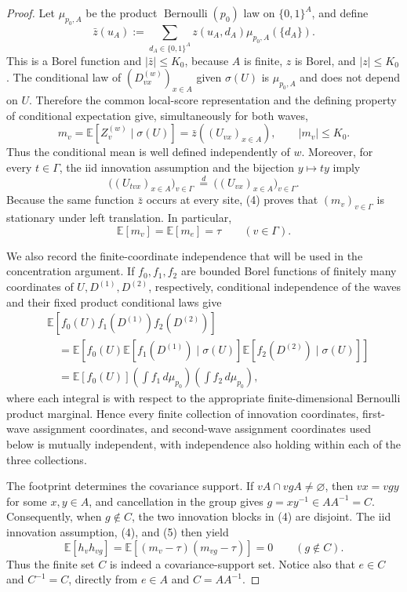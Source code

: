 \documentclass{article}
\begin{document}
\begin{proof}
Let \(\mu_{p_0,A}\) be the product \(\operatorname{Bernoulli}(p_0)\) law on \(\{0,1\}^A\), and define
\[
 \bar z(u_A)
 :=\sum_{d_A\in\{0,1\}^A}
 z(u_A,d_A)\mu_{p_0,A}(\{d_A\}). \tag{3}
\]
This is a Borel function and \(|\bar z|\le K_0\), because \(A\) is finite, \(z\) is Borel, and \(|z|\le K_0\).  The conditional law of \((D_{vx}^{(w)})_{x\in A}\) given \(\sigma(U)\) is \(\mu_{p_0,A}\) and does not depend on \(U\).  Therefore the common local-score representation and the defining property of conditional expectation give, simultaneously for both waves,
\[
 m_v
 =\mathbb E[Z_v^{(w)}\mid\sigma(U)]
 =\bar z((U_{vx})_{x\in A}),
 \qquad |m_v|\le K_0. \tag{4}
\]
Thus the conditional mean is well defined independently of \(w\).  Moreover, for every \(t\in\Gamma\), the iid innovation assumption and the bijection \(y\mapsto ty\) imply
\[
 \bigl((U_{tvx})_{x\in A}\bigr)_{v\in\Gamma}
 \ \stackrel{d}{=}\ 
 \bigl((U_{vx})_{x\in A}\bigr)_{v\in\Gamma}.
\]
Because the same function \(\bar z\) occurs at every site, (4) proves that \((m_v)_{v\in\Gamma}\) is stationary under left translation.  In particular,
\[
 \mathbb E[m_v]=\mathbb E[m_e]=\tau
 \qquad(v\in\Gamma). \tag{5}
\]

We also record the finite-coordinate independence that will be used in the concentration argument.  If \(f_0,f_1,f_2\) are bounded Borel functions of finitely many coordinates of \(U,D^{(1)},D^{(2)}\), respectively, conditional independence of the waves and their fixed product conditional laws give
\[
 \begin{aligned}
 &\mathbb E[f_0(U)f_1(D^{(1)})f_2(D^{(2)})]\\
 &\quad=\mathbb E\!\left[
 f_0(U)\mathbb E[f_1(D^{(1)})\mid\sigma(U)]
          \mathbb E[f_2(D^{(2)})\mid\sigma(U)]\right]\\
 &\quad=\mathbb E[f_0(U)]
       \left(\int f_1\,d\mu_{p_0}\right)
       \left(\int f_2\,d\mu_{p_0}\right),
 \end{aligned} \tag{6}
\]
where each integral is with respect to the appropriate finite-dimensional Bernoulli product marginal.  Hence every finite collection of innovation coordinates, first-wave assignment coordinates, and second-wave assignment coordinates used below is mutually independent, with independence also holding within each of the three collections.

The footprint determines the covariance support.  If \(vA\cap vgA\ne\varnothing\), then \(vx=vgy\) for some \(x,y\in A\), and cancellation in the group gives \(g=xy^{-1}\in AA^{-1}=C\).  Consequently, when \(g\notin C\), the two innovation blocks in (4) are disjoint.  The iid innovation assumption, (4), and (5) then yield
\[
 \mathbb E[h_vh_{vg}]
 =\mathbb E[(m_v-\tau)(m_{vg}-\tau)]=0
 \qquad(g\notin C). \tag{7}
\]
Thus the finite set \(C\) is indeed a covariance-support set.  Notice also that \(e\in C\) and \(C^{-1}=C\), directly from \(e\in A\) and \(C=AA^{-1}\).


\end{proof}
\end{document}

